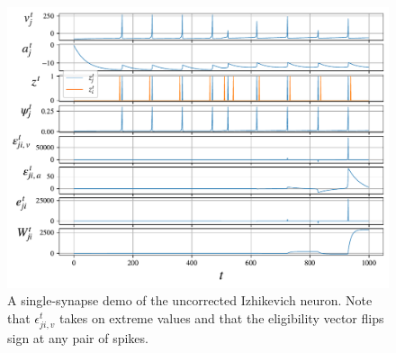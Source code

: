 \begin{figure}[ht]
    \centering
    \includegraphics[width=\linewidth]{gfx/demo_izh}
    \caption[A single-synapse demo of the uncorrected Izhikevich neuron.]{A single-synapse demo of the uncorrected Izhikevich neuron. Note that $\epsilon^t_{ji, v}$ takes on extreme values and that the eligibility vector flips sign at any pair of spikes.}
    \label{fig:demo_izh}
\end{figure}

